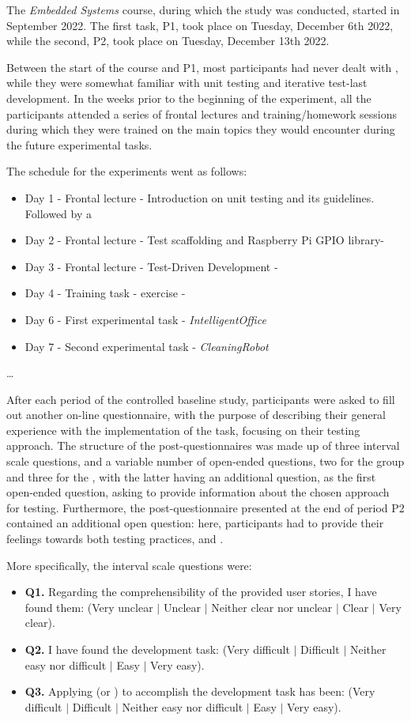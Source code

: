 The \textit{Embedded Systems} course, during which the study was conducted, started in September 2022. The first task, P1, took place on Tuesday, December 6th 2022, while the second, P2, took place on Tuesday, December 13th 2022.

Between the start of the course and P1, most participants had never dealt with \tdd, while they were somewhat familiar with unit testing and iterative test-last development. 
In the weeks prior to the beginning of the experiment, all the participants attended a series of frontal lectures and training/homework sessions during which they were trained on the main topics they would encounter during the future experimental tasks.

The schedule for the experiments went as follows:
\begin{itemize}
    \item Day 1 - Frontal lecture - Introduction on unit testing and its guidelines. Followed by a
    \item Day 2 - Frontal lecture - Test scaffolding and Raspberry Pi GPIO library- 
    \item Day 3 - Frontal lecture - Test-Driven Development -
    \item Day 4 - Training task - \tdd exercise - 
    \item Day 6 - First experimental task - \textit{IntelligentOffice}
    \item Day 7 - Second experimental task - \textit{CleaningRobot}
\end{itemize}
\dots

After each period of the controlled baseline study, participants were asked to fill out another on-line questionnaire, with the purpose of describing their general experience with the implementation of the task, focusing on their testing approach. 
The structure of the post-questionnaires was made up of three interval scale questions, and a variable number of open-ended questions, two for the \tdd group and three for the \notdd, with the latter having an additional question, as the first open-ended question, asking to provide information about the chosen approach for testing. Furthermore, the post-questionnaire presented at the end of period P2 contained an additional open question: here, participants had to provide their feelings towards both testing practices, \tdd and \notdd. 

More specifically, the interval scale questions were:
\begin{itemize}
    \item \textbf{Q1.} Regarding the comprehensibility of the provided user stories, I have found them: (Very unclear $|$ Unclear $|$ Neither clear nor unclear $|$ Clear $|$ Very clear).
    \item \textbf{Q2.} I have found the development task: (Very difficult $|$ Difficult $|$ Neither easy nor difficult $|$ Easy $|$ Very easy).
    \item \textbf{Q3.} Applying (\ie \tdd or \notdd) to accomplish the development task has been: (Very difficult $|$ Difficult $|$ Neither easy nor difficult $|$ Easy $|$ Very easy).
\end{itemize}

